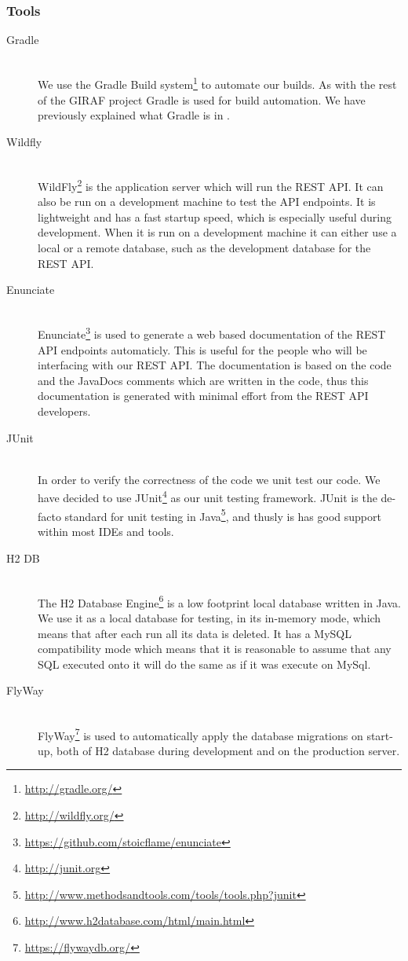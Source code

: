 \subsubsection{Tools}
\begin{description}
    \item[Gradle] \hfill \\
        We use the Gradle Build system\footnote{\url{http://gradle.org/}} to automate our builds. 
        As with the rest of the GIRAF project Gradle is used for build automation. 
        We have previously explained what Gradle is in .

    \item[Wildfly] \hfill \\
        WildFly\footnote{\url{http://wildfly.org/}} is the application server which will run the REST API. 
        It can also be run on a development machine to test the API endpoints. 
        It is lightweight and has a fast startup speed, which is especially useful during development. 
        When it is run on a development machine it can either use a local or a remote database, such as the development database for the REST API. 

    \item[Enunciate] \hfill \\
        Enunciate\footnote{\url{https://github.com/stoicflame/enunciate}} is used to generate a web based documentation of the REST API endpoints automaticly. 
        This is useful for the people who will be interfacing with our REST API.
        The documentation is based on the code and the JavaDocs comments which are written in the code, thus this documentation is generated with minimal effort from the REST API developers.

    \item[JUnit] \hfill \\
        In order to verify the correctness of the code we unit test our code. 
        We have decided to use JUnit\footnote{\url{http://junit.org}} as our unit testing framework.
        JUnit is the de-facto standard for unit testing in Java\footnote{\url{http://www.methodsandtools.com/tools/tools.php?junit}}, and thusly is has good support within most IDEs and tools. 

    \item[H2 DB] \hfill \\
        The H2 Database Engine\footnote{\url{http://www.h2database.com/html/main.html}} is a low footprint local database written in Java. 
        We use it as a local database for testing, in its in-memory mode, which means that after each run all its data is deleted.
        It has a MySQL compatibility mode which means that it is reasonable to assume that any SQL executed onto it will do the same as if it was execute on MySql.

    \item[FlyWay] \hfill \\
        FlyWay\footnote{\url{https://flywaydb.org/}} is used to automatically apply the database migrations on start-up, both of H2 database during development and on the production server.
\end{description}
